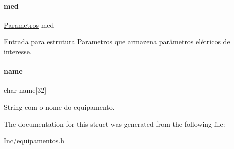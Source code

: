 \paragraph{\texorpdfstring{med}{med}}
{\footnotesize\ttfamily \hyperlink{struct_parametros}{Parametros} med}

Entrada para estrutura \hyperlink{struct_parametros}{Parametros} que armazena parâmetros elétricos de interesse. \mbox{\label{struct_equipamento_abc1e86d7c344fe34ff09e72d4595ab7e}} 
\paragraph{\texorpdfstring{name}{name}}
{\footnotesize\ttfamily char name\mbox{[}32\mbox{]}}

String com o nome do equipamento. 

The documentation for this struct was generated from the following file\+:\begin{DoxyCompactItemize}
\item 
Inc/\hyperlink{equipamentos_8h}{equipamentos.\+h}\end{DoxyCompactItemize}
